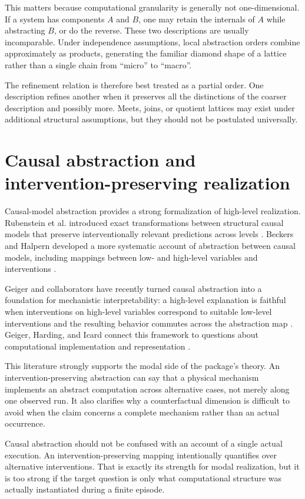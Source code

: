 \documentclass[11pt,a4paper]{article}
\begin{document}
This matters because computational granularity is generally not one-dimensional. If a system has components $A$ and $B$, one may retain the internals of $A$ while abstracting $B$, or do the reverse. These two descriptions are usually incomparable. Under independence assumptions, local abstraction orders combine approximately as products, generating the familiar diamond shape of a lattice rather than a single chain from ``micro'' to ``macro''.

The refinement relation is therefore best treated as a partial order. One description refines another when it preserves all the distinctions of the coarser description and possibly more. Meets, joins, or quotient lattices may exist under additional structural assumptions, but they should not be postulated universally.

\section{Causal abstraction and intervention-preserving realization}

Causal-model abstraction provides a strong formalization of high-level realization. Rubenstein et al. introduced exact transformations between structural causal models that preserve interventionally relevant predictions across levels \cite{Rubenstein2017}. Beckers and Halpern developed a more systematic account of abstraction between causal models, including mappings between low- and high-level variables and interventions \cite{BeckersHalpern2019}.

Geiger and collaborators have recently turned causal abstraction into a foundation for mechanistic interpretability: a high-level explanation is faithful when interventions on high-level variables correspond to suitable low-level interventions and the resulting behavior commutes across the abstraction map \cite{Geiger2025}. Geiger, Harding, and Icard connect this framework to questions about computational implementation and representation \cite{GeigerHardingIcard2026}.

This literature strongly supports the modal side of the package's theory. An intervention-preserving abstraction can say that a physical mechanism implements an abstract computation across alternative cases, not merely along one observed run. It also clarifies why a counterfactual dimension is difficult to avoid when the claim concerns a complete mechanism rather than an actual occurrence.

\begin{cautionbox}
Causal abstraction should not be confused with an account of a single actual execution. An intervention-preserving mapping intentionally quantifies over alternative interventions. That is exactly its strength for modal realization, but it is too strong if the target question is only what computational structure was actually instantiated during a finite episode.
\end{cautionbox}
\end{document}
